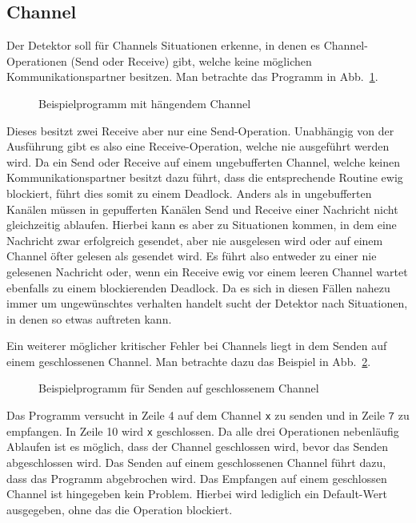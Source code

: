 \subsection{Channel}\label{Chap:Back-Sec:Prob-SubSec:Channel}
Der Detektor soll für Channels Situationen erkenne, in denen es 
Channel-Operationen (Send oder Receive) gibt, welche keine möglichen Kommunikationspartner
besitzen. 
Man betrachte das Programm in Abb.~\ref{Chap:Analyze-Sec:Channel-SubSec:Dangling-Fig:ExDangling}.
\begin{figure}[h!]
  
  \caption{Beispielprogramm mit hängendem Channel}
  \label{Chap:Analyze-Sec:Channel-SubSec:Dangling-Fig:ExDangling}
\end{figure}
Dieses besitzt zwei Receive aber nur eine Send-Operation. Unabhängig von der Ausführung 
gibt es also eine Receive-Operation, welche nie ausgeführt werden wird. 
Da ein Send oder Receive auf einem ungebufferten Channel, welche keinen 
Kommunikationspartner besitzt dazu führt, dass die entsprechende Routine 
ewig blockiert, führt dies somit zu einem Deadlock. 
Anders als in ungebufferten Kanälen müssen in gepufferten Kanälen Send und 
Receive einer Nachricht nicht gleichzeitig ablaufen. Hierbei kann es aber 
zu Situationen kommen, in dem eine Nachricht zwar erfolgreich gesendet, aber
nie ausgelesen wird oder auf einem Channel öfter gelesen als 
gesendet wird. Es führt also entweder zu einer nie gelesenen Nachricht 
oder, wenn ein Receive ewig vor einem leeren Channel wartet ebenfalls zu einem 
blockierenden Deadlock. Da es sich in diesen Fällen 
nahezu immer um ungewünschtes verhalten handelt sucht der Detektor nach 
Situationen, in denen so etwas auftreten kann.

Ein weiterer möglicher kritischer Fehler bei Channels liegt in dem 
Senden auf einem geschlossenen Channel. Man betrachte dazu das Beispiel in 
Abb.~\ref{Chap:Analyze-Sec:Channel-SubSec:Close-Fig:close}. 
\begin{figure}[h!]
  
  \caption{Beispielprogramm für Senden auf geschlossenem Channel} 
  \label{Chap:Analyze-Sec:Channel-SubSec:Close-Fig:close}
\end{figure}
Das Programm 
versucht in Zeile 4 auf dem Channel \texttt{x} zu senden und in Zeile 
$\texttt{7}$ zu empfangen. In Zeile 10 wird \texttt{x} geschlossen. Da alle 
drei Operationen nebenläufig Ablaufen ist es möglich, dass der Channel 
geschlossen wird, bevor das Senden abgeschlossen wird.
Das Senden auf einem geschlossenen Channel führt dazu, dass das Programm 
abgebrochen wird. 
Das Empfangen auf einem geschlossen Channel ist hingegeben kein Problem.
Hierbei wird lediglich ein Default-Wert ausgegeben, ohne das die Operation
blockiert. 


